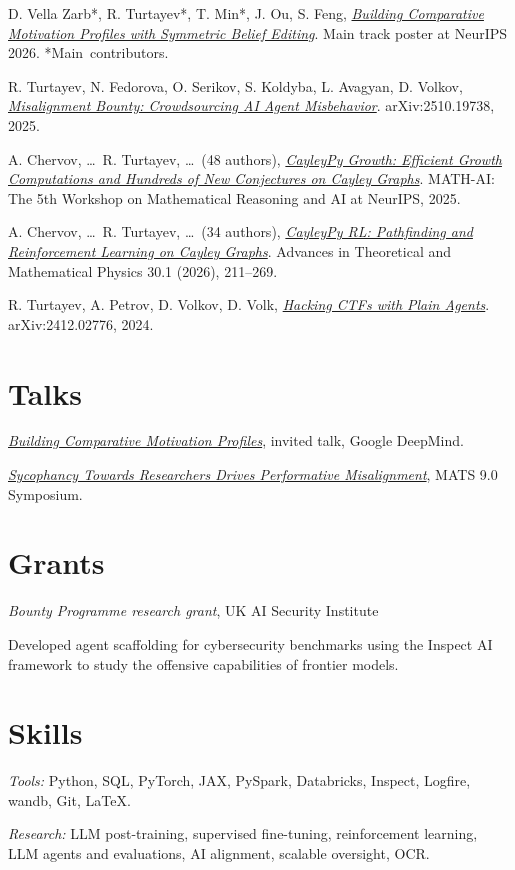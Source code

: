 \documentclass[11pt,letterpaper]{article}
\newlength{\gutter}
\newcommand{\entry}[2]{\par\leavevmode\llap{\makebox[\gutter][l]{\footnotesize #1}}#2\par}
\begin{document}
D. Vella Zarb*, R. Turtayev*, T. Min*, J. Ou, S. Feng, \href{https://arxiv.org/abs/2606.08243}{\textit{Building Comparative Motivation Profiles with Symmetric Belief Editing}}. Main track poster at NeurIPS 2026. *Main~contributors.
\medskip

R. Turtayev, N. Fedorova, O. Serikov, S. Koldyba, L. Avagyan, D. Volkov, \href{https://arxiv.org/abs/2510.19738}{\textit{Misalignment Bounty: Crowdsourcing AI Agent Misbehavior}}. arXiv:2510.19738, 2025.
\medskip

A. Chervov, \dots\ R. Turtayev, \dots\ (48 authors), \href{https://arxiv.org/abs/2509.19162}{\textit{CayleyPy Growth: Efficient Growth Computations and Hundreds of New Conjectures on Cayley Graphs}}. MATH-AI: The 5th Workshop on Mathematical Reasoning and AI at NeurIPS, 2025.
\medskip

A. Chervov, \dots\ R. Turtayev, \dots\ (34 authors), \href{https://arxiv.org/abs/2502.18663}{\textit{CayleyPy RL: Pathfinding and Reinforcement Learning on Cayley Graphs}}. Advances in Theoretical and Mathematical Physics 30.1 (2026), 211--269.
\medskip

R. Turtayev, A. Petrov, D. Volkov, D. Volk, \href{https://arxiv.org/abs/2412.02776}{\textit{Hacking CTFs with Plain Agents}}. arXiv:2412.02776, 2024.\par
\endgroup

\section*{Talks}

\entry{Jun. 2026}{\href{https://docs.google.com/presentation/d/1qTMRi5J3RNZu5grSI4Qcpis-KFT3_OT4wkn2Il33if8/edit?usp=sharing}{\textit{Building Comparative Motivation Profiles}}, invited talk, Google DeepMind.}
\medskip

\entry{Mar. 2026}{\href{https://docs.google.com/presentation/d/19yC-NOMdDw1FunHvScEOtZZTXYNgJ42b2gmoLMwge2k/edit?usp=sharing}{\textit{Sycophancy Towards Researchers Drives Performative Misalignment}}, MATS 9.0 Symposium.}

\section*{Grants}

\entry{Feb. -- Mar. 2025}{\textit{Bounty Programme research grant}, UK AI Security Institute}
Developed agent scaffolding for cybersecurity benchmarks using the Inspect AI framework to study the offensive capabilities of frontier models.

\section*{Skills}

\textit{Tools:} Python, SQL, PyTorch, JAX, PySpark, Databricks, Inspect, Logfire, wandb, Git, \LaTeX.\par
\smallskip
\textit{Research:} LLM post-training, supervised fine-tuning, reinforcement learning, LLM agents and evaluations, AI alignment, scalable oversight, OCR.
\end{document}
